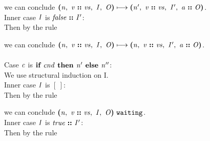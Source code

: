 \documentclass[12pt]{article}
\begin{document}
we can conclude
$\steps{
   \cfg{\nterm{n}}{\cons{\nterm{v}}{\nterm{vs}}}{\nterm{I}}{\nterm{O}}
 }{
   \cfg{\nterm{n'}}{\cons{\nterm{v}}{\nterm{vs}}}{\nterm{I'}}{\cons{\nterm{a}}{\nterm{O}}}
 }$.\\

Inner case $\nterm{I}$ is $\cons{\nterm{false}}{\nterm{I'}}$:\\

Then by the rule

\begin{mathpar}
\end{mathpar}

we can conclude
$\steps{
   \cfg{\nterm{n}}{\cons{\nterm{v}}{\nterm{vs}}}{\nterm{I}}{\nterm{O}}
 }{
   \cfg{\nterm{n}}{\cons{\nterm{v}}{\nterm{vs}}}{\nterm{I'}}{\cons{\nterm{a}}{\nterm{O}}}
 }$.\\
\\

Case $\nterm{c}$ is $\ifelse{\nterm{cnd}}{\nterm{n'}}{\nterm{n''}}$:\\

We use structural induction on I.\\

Inner case $\nterm{I}$ is $[\ ]$:\\

Then by the rule

\begin{mathpar}
\end{mathpar}

we can conclude
$\waiting{\cfg{\nterm{n}}{\cons{\nterm{v}}{\nterm{vs}}}{\nterm{I}}{\nterm{O}}}$.\\

Inner case $\nterm{I}$ is $\cons{\nterm{true}}{\nterm{I'}}$:\\

Then by the rule

\begin{mathpar}
\end{mathpar}
\end{document}
